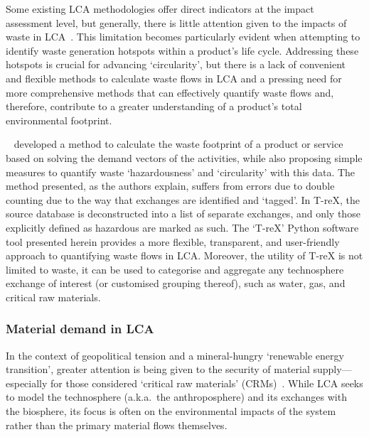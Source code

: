 \documentclass[a4paper,fleqn]{cas-dc}
\begin{document}
Some existing LCA methodologies offer direct indicators at the impact
assessment level, but generally, there is little attention given to the impacts
of waste in LCA~\citep{lauran2020abioticdepletion}. This limitation becomes
particularly evident when attempting to identify waste generation hotspots
within a product's life cycle. Addressing these hotspots is crucial for
advancing `circularity', but there is a lack of convenient and flexible methods
to calculate waste flows in LCA and a pressing need for more comprehensive
methods that can effectively quantify waste flows and, therefore, contribute to
a greater understanding of a product's total environmental footprint.

~\cite{laurenti2023wastefootprint} developed a method to calculate the waste footprint of a product or service based on solving the demand vectors of the activities, while also proposing simple measures to quantify waste `hazardousness' and `circularity' with this data. The method presented, as the authors explain, suffers from errors due to double counting due to the way that exchanges are identified and `tagged'. In T-reX, the source database is deconstructed into a list of separate exchanges, and only those explicitly defined as hazardous are marked as such. The `T-reX' Python software tool presented herein provides a more flexible, transparent, and user-friendly approach to quantifying waste flows in LCA\@. Moreover, the utility of T-reX is not limited to waste, it can be used to categorise and aggregate any technosphere exchange of interest (or customised grouping thereof), such as water, gas, and critical raw materials.

\subsubsection{Material demand in LCA}\label{sec:intro-material}

In the context of geopolitical tension and a mineral-hungry `renewable energy
transition', greater attention is being given to the security of material
supply---especially for those considered `critical raw materials'
(CRMs)~\citep{eu2023crmstudy,hool2023crm,mancini2013supplysecurity,jrc2023supplychain,hartley2024cepolitics,salviulo2021supplychain,iea2023crm,iea2023energytechperspectives}.
While LCA seeks to model the technosphere (a.k.a.\ the anthroposphere) and its
exchanges with the biosphere, its focus is often on the environmental impacts
of the system rather than the primary material flows themselves.
\end{document}
